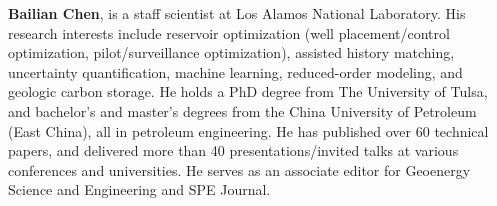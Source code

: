 \documentclass[a4paper,fleqn]{cas-sc}
\begin{document}
\bio{}
{\bf Bailian Chen}, is a staff scientist at Los Alamos National Laboratory. His research interests include reservoir optimization (well placement/control optimization, pilot/surveillance optimization), assisted history matching, uncertainty quantification, machine learning, reduced-order modeling, and geologic carbon storage. He holds a PhD degree from The University of Tulsa, and bachelor’s and master’s degrees from the China University of Petroleum (East China), all in petroleum engineering. He has published over 60 technical papers, and delivered more than 40 presentations/invited talks at various conferences and universities. He serves as an associate editor for Geoenergy Science and Engineering and SPE Journal.
\endbio
\end{document}
